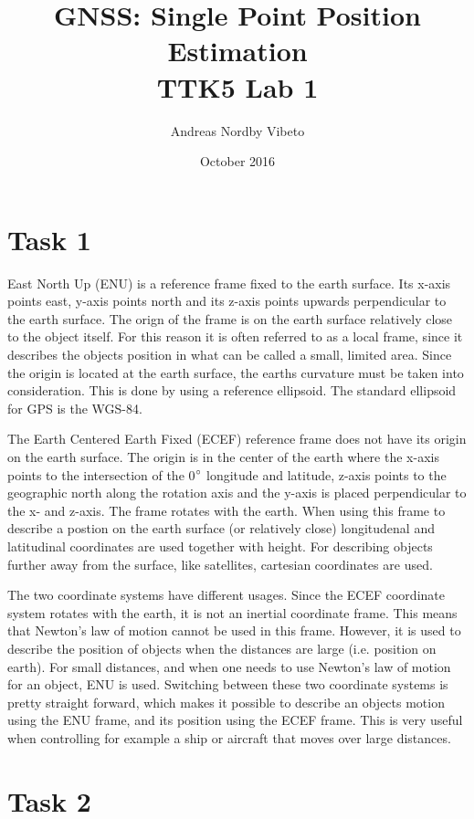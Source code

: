 \documentclass{article}
\title{GNSS: Single Point Position Estimation \\
	   \normalsize{TTK5 Lab 1}}
\author{Andreas Nordby Vibeto}
\date{October 2016}
\begin{document}
\maketitle

\section*{Task 1}

East North Up (ENU) is a reference frame fixed to the earth surface. Its x-axis points east, y-axis points north and its z-axis points upwards perpendicular to the earth surface. The orign of the frame is on the earth surface relatively close to the object itself. For this reason it is often referred to as a local frame, since it describes the objects position in what can be called a small, limited area. Since the origin is located at the earth surface, the earths curvature must be taken into consideration. This is done by using a reference ellipsoid. The standard ellipsoid for GPS is the WGS-84.

The Earth Centered Earth Fixed (ECEF) reference frame does not have its origin on the earth surface. The origin is in the center of the earth where the x-axis points to the intersection of the 0$\degree$ longitude and latitude, z-axis points to the geographic north along the rotation axis and the y-axis is placed perpendicular to the x- and z-axis. The frame rotates with the earth. When using this frame to describe a postion on the earth surface (or relatively close) longitudenal and latitudinal coordinates are used together with height. For describing objects further away from the surface, like satellites, cartesian coordinates are used.

The two coordinate systems have different usages. Since the ECEF coordinate system rotates with the earth, it is not an inertial coordinate frame. This means that Newton's law of motion cannot be used in this frame. However, it is used to describe the position of objects when the distances are large (i.e. position on earth). For small distances, and when one needs to use Newton's law of motion for an object, ENU is used. Switching between these two coordinate systems is pretty straight forward, which makes it possible to describe an objects motion using the ENU frame, and its position using the ECEF frame. This is very useful when controlling for example a ship or aircraft that moves over large distances.


\section*{Task 2}
\end{document}
